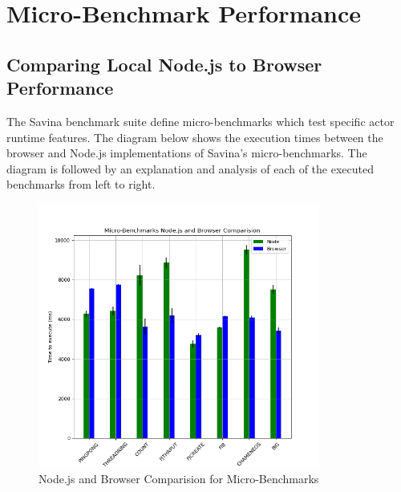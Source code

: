 \documentclass[12pt, a4paper]{report}
\theoremstyle{definition}
\theoremstyle{definition}%
\theoremstyle{definition}%
\theoremstyle{definition}%
\theoremstyle{definition}%
\theoremstyle{definition}%
\begin{document}
\section{Micro-Benchmark Performance}
\subsection{Comparing Local Node.js to Browser Performance}
The Savina benchmark suite define micro-benchmarks which test specific actor runtime features. The diagram below shows the execution times between the browser and Node.js implementations of Savina's micro-benchmarks. The diagram is followed by an explanation and analysis of each of the executed benchmarks from left to right.
\begin{figure}[H]
    \begin{centering}
        \includegraphics[width=350px]{resources/micro.png}
        \caption{Node.js and Browser Comparision for Micro-Benchmarks}
    \end{centering}
\end{figure}
\end{document}
